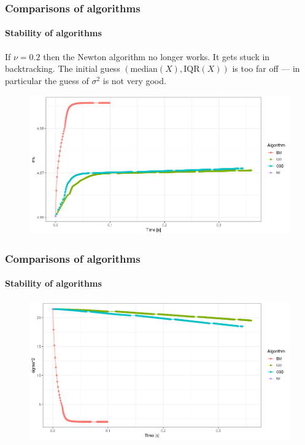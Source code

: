 \documentclass[aspectratio=169]{beamer}
\begin{document}
\begin{frame}
    \frametitle{Comparisons of algorithms}
    \framesubtitle{Stability of algorithms}
    If $\nu = 0.2$ then the Newton algorithm no longer works. It gets stuck in backtracking. The initial guess $(\text{median}(X), \text{IQR}(X))$ is too far off --- in particular the guess of $\sigma^{2}$ is not very good.
    \begin{figure}
        \centering
        \includegraphics[scale = 0.4]{pictures/NewComp/AllMuNu0_2.png}
    \end{figure}
\end{frame}
\begin{frame}
    \frametitle{Comparisons of algorithms}
    \framesubtitle{Stability of algorithms}
    \begin{figure}
        \centering
        \includegraphics[scale = 0.4]{pictures/NewComp/AllSigmaNu0_2.png}
    \end{figure}
\end{frame}
\end{document}
